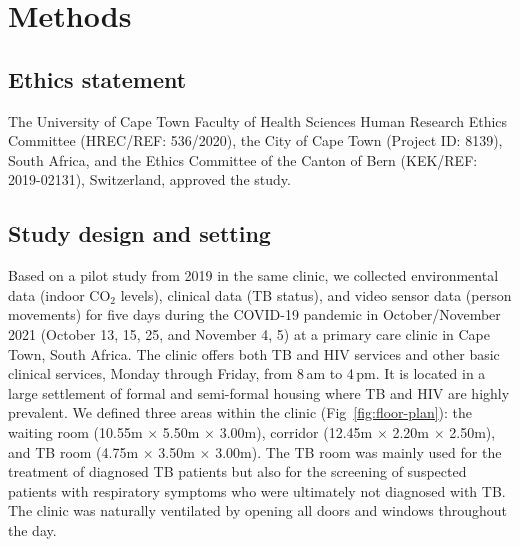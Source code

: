 \documentclass[fleqn,11pt]{wlscirep}
\begin{document}
\newpage

\section*{Methods}

\subsection*{Ethics statement}

The University of Cape Town Faculty of Health Sciences Human Research Ethics Committee (HREC/REF: 536/2020), the City of Cape Town (Project ID: 8139), South Africa, and the Ethics Committee of the Canton of Bern (KEK/REF: 2019-02131), Switzerland, approved the study.

\subsection*{Study design and setting}

Based on a pilot study from 2019 in the same clinic\cite{Zurcher2022JID,Zurcher2020BMJ}, we collected environmental data (indoor CO$_2$ levels), clinical data (TB status), and video sensor data (person movements) for five days during the COVID-19 pandemic in October/November 2021 (October 13, 15, 25, and November 4, 5) at a primary care clinic in Cape Town, South Africa. The clinic offers both TB and HIV services and other basic clinical services, Monday through Friday, from 8\,am to 4\,pm. It is located in a large settlement of formal and semi-formal housing where TB and HIV are highly prevalent\cite{Wood2007AMJRCCD,Middelkoop2011JAIDS}. We defined three areas within the clinic (Fig~\ref{fig:floor-plan}): the waiting room (10.55m $\times$ 5.50m $\times$ 3.00m), corridor (12.45m $\times$ 2.20m $\times$ 2.50m), and TB room (4.75m $\times$ 3.50m $\times$ 3.00m). The TB room was mainly used for the treatment of diagnosed TB patients but also for the screening of suspected patients with respiratory symptoms who were ultimately not diagnosed with TB. The clinic was naturally ventilated by opening all doors and windows throughout the day.
\end{document}
